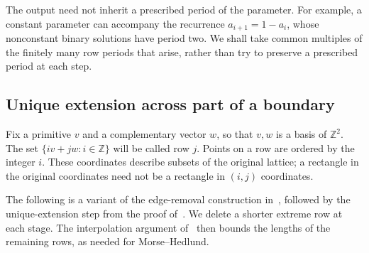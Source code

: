 \documentclass[11pt,a4paper,reqno]{amsart}
\theoremstyle{remark}
\newcommand{\Z}{\mathbb Z}
\numberwithin{equation}{section}
\begin{document}
The output need not inherit a prescribed period of the parameter. For example, a constant parameter can accompany the recurrence $a_{i+1}=1-a_i$, whose nonconstant binary solutions have period two. We shall take common multiples of the finitely many row periods that arise, rather than try to preserve a prescribed period at each step.

\subsection{Unique extension across part of a boundary}
Fix a primitive $v$ and a complementary vector $w$, so that $v,w$ is a basis of $\Z^2$. The set $\{iv+jw:i\in\Z\}$ will be called row $j$. Points on a row are ordered by the integer $i$. These coordinates describe subsets of the original lattice; a rectangle in the original coordinates need not be a rectangle in $(i,j)$ coordinates.

The following is a variant of the edge-removal construction in~\cite[Lemma~2]{Sz}, followed by the unique-extension step from the proof of~\cite[Lemma~4]{Sz}. We delete a shorter extreme row at each stage. The interpolation argument of~\cite[Lemma~2.11]{CK} then bounds the lengths of the remaining rows, as needed for Morse--Hedlund.
\end{document}
